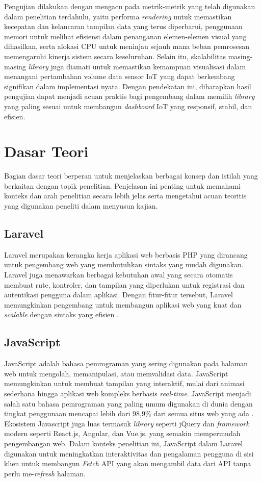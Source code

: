 Pengujian dilakukan dengan mengacu pada metrik-metrik yang telah digunakan dalam penelitian terdahulu, yaitu performa \textit{rendering} untuk memastikan kecepatan dan kelancaran tampilan data yang terus diperbarui, penggunaan memori untuk melihat efisiensi dalam penanganan elemen-elemen visual yang dihasilkan, serta alokasi CPU untuk meninjau sejauh mana beban pemrosesan memengaruhi kinerja sistem secara keseluruhan. Selain itu, skalabilitas masing-masing \textit{library} juga diamati untuk memastikan kemampuan visualisasi dalam menangani pertambahan volume data sensor IoT yang dapat berkembang signifikan dalam implementasi nyata. Dengan pendekatan ini, diharapkan hasil pengujian dapat menjadi acuan praktis bagi pengembang dalam memilih \textit{library} yang paling sesuai untuk membangun \textit{dashboard} IoT yang responsif, stabil, dan efisien.

\section{Dasar Teori}
Bagian dasar teori berperan untuk menjelaskan berbagai konsep dan istilah yang berkaitan dengan topik penelitian. Penjelasan ini penting untuk memahami konteks dan arah penelitian secara lebih jelas serta mengetahui acuan teoritis yang digunakan peneliti dalam menyusun kajian.

\subsection{Laravel}
Laravel merupakan kerangka kerja aplikasi web berbasis PHP yang dirancang untuk pengembang web yang membutuhkan sintaks yang mudah digunakan. Laravel juga menawarkan berbagai kebutuhan awal yang secara otomatis membuat rute, kontroler, dan tampilan yang diperlukan untuk registrasi dan autentikasi pengguna dalam aplikasi. Dengan fitur-fitur tersebut, Laravel memungkinkan pengembang untuk membangun aplikasi web yang kuat dan \textit{scalable} dengan sintaks yang efisien \cite{Laravel}.

\subsection{JavaScript}
JavaScript adalah bahasa pemrograman yang sering digunakan pada halaman web untuk mengolah, memanipulasi, atau memvalidasi data. JavaScript memungkinkan untuk membuat tampilan yang interaktif, mulai dari animasi sederhana hingga aplikasi web kompleks berbasis \textit{real-time}. JavaScript menjadi salah satu bahasa pemrograman yang paling umum digunakan di dunia dengan tingkat penggunaan mencapai lebih dari 98,9\% dari semua situs web yang ada \cite{JavaScript}. Ekosistem Javascript juga luas termasuk \textit{library} seperti jQuery dan \textit{framework} modern seperti React.js, Angular, dan Vue.js, yang semakin mempermudah pengembangan web. Dalam konteks penelitian ini, JavaScript dalam Laravel digunakan untuk meningkatkan interaktivitas dan pengalaman pengguna di sisi klien untuk membangun \textit{Fetch} API yang akan mengambil data dari API tanpa perlu me-\textit{refresh} halaman.

